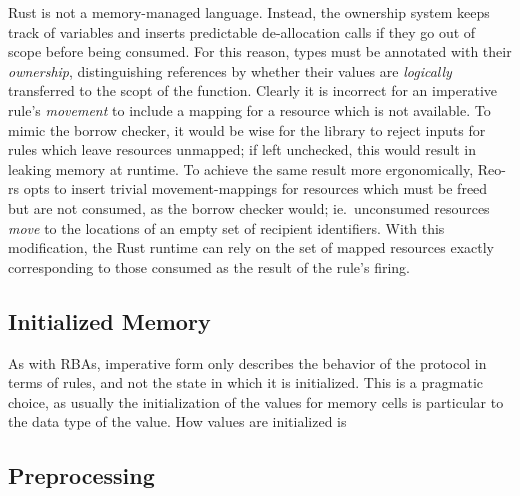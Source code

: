 Rust is not a memory-managed language. Instead, the ownership system keeps track of variables and inserts predictable de-allocation calls if they go out of scope before being consumed. For this reason, types must be annotated with their \textit{ownership}, distinguishing references by whether their values are \textit{logically} transferred to the scopt of the function. Clearly it is incorrect for an imperative rule's \textit{movement} to include a mapping for a resource which is not available. 
To mimic the borrow checker, it would be wise for the library to reject inputs for rules which leave resources unmapped; if left unchecked, this would result in leaking memory at runtime. To achieve the same result more ergonomically, Reo-rs opts to insert trivial movement-mappings for resources which must be freed but are not consumed, as the borrow checker would; ie.\ unconsumed resources \textit{move} to the locations of an empty set of recipient identifiers. With this modification, the Rust runtime can rely on the set of mapped resources exactly corresponding to those consumed as the result of the rule's firing.

\subsection{Initialized Memory}
As with RBAs, imperative form only describes the behavior of the protocol in terms of rules, and not the state in which it is initialized. This is a pragmatic choice, as usually the initialization of the values for memory cells is particular to the data type of the value. How values are initialized is 

\subsection{Preprocessing}